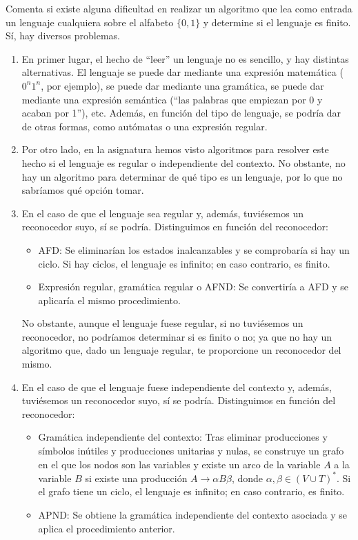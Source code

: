 \documentclass[12pt]{article}
\begin{document}
    \begin{ejercicio}[1.25 puntos]
        Comenta si existe alguna dificultad en realizar un algoritmo que lea como entrada un lenguaje cualquiera sobre el
        alfabeto $\{0, 1\}$ y determine si el lenguaje es finito.\\

        Sí, hay diversos problemas.
        \begin{enumerate}
            \item En primer lugar, el hecho de ``leer'' un lenguaje no es sencillo, y hay distintas alternativas. El lenguaje se puede dar mediante una expresión matemática ($0^n1^n$, por ejemplo), se puede dar mediante una gramática, se puede dar mediante una expresión semántica (``las palabras que empiezan por 0 y acaban por 1''), etc. Además, en función del tipo de lenguaje, se podría dar de otras formas, como autómatas o una expresión regular.
            \item Por otro lado, en la asignatura hemos visto algoritmos para resolver este hecho si el lenguaje es regular o independiente del contexto. No obstante, no hay un algoritmo para determinar de qué tipo es un lenguaje, por lo que no sabríamos qué opción tomar.
            \item En el caso de que el lenguaje sea regular y, además, tuviésemos un reconocedor suyo, sí se podría. Distinguimos en función del reconocedor:
            \begin{itemize}
                \item AFD: Se eliminarían los estados inalcanzables y se comprobaría si hay un ciclo. Si hay ciclos, el lenguaje es infinito; en caso contrario, es finito.
                \item Expresión regular, gramática regular o AFND: Se convertiría a AFD y se aplicaría el mismo procedimiento.
            \end{itemize}

            No obstante, aunque el lenguaje fuese regular, si no tuviésemos un reconocedor, no podríamos determinar si es finito o no; ya que no hay un algoritmo que, dado un lenguaje regular, te proporcione un reconocedor del mismo.

            \item En el caso de que el lenguaje fuese independiente del contexto y, además, tuviésemos un reconocedor suyo, sí se podría. Distinguimos en función del reconocedor:
            \begin{itemize}
                \item Gramática independiente del contexto: Tras eliminar producciones y símbolos inútiles y producciones unitarias y nulas, se construye un grafo en el que los nodos son las variables y existe un arco de la variable $A$ a la variable $B$ si existe una producción $A \to \alpha B \beta$, donde $\alpha, \beta \in (V \cup T)^*$. Si el grafo tiene un ciclo, el lenguaje es infinito; en caso contrario, es finito.
                \item APND: Se obtiene la gramática independiente del contexto asociada y se aplica el procedimiento anterior.
            \end{itemize}


\end{enumerate}
\end{ejercicio}
\end{document}
